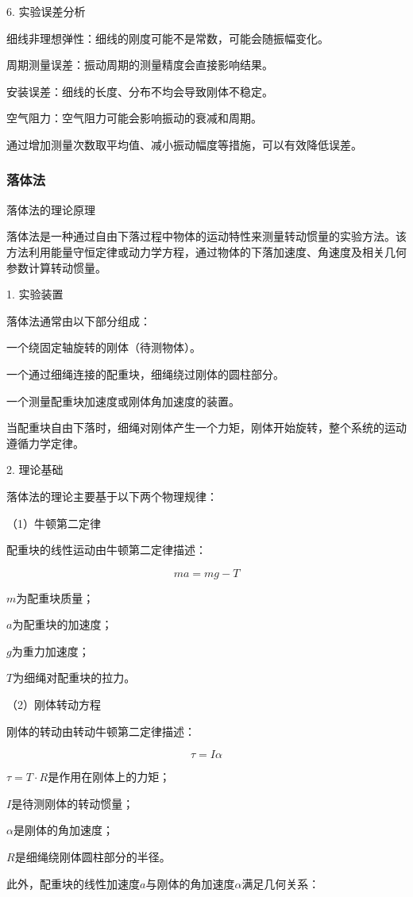 \documentclass[12pt,hyperref,a4paper,UTF8]{ctexart}
\begin{document}
6. 实验误差分析

细线非理想弹性：细线的刚度可能不是常数，可能会随振幅变化。

周期测量误差：振动周期的测量精度会直接影响结果。

安装误差：细线的长度、分布不均会导致刚体不稳定。

空气阻力：空气阻力可能会影响振动的衰减和周期。


通过增加测量次数取平均值、减小振动幅度等措施，可以有效降低误差。

\subsubsection{落体法}

落体法的理论原理

落体法是一种通过自由下落过程中物体的运动特性来测量转动惯量的实验方法。该方法利用能量守恒定律或动力学方程，通过物体的下落加速度、角速度及相关几何参数计算转动惯量。

1. 实验装置

落体法通常由以下部分组成：

一个绕固定轴旋转的刚体（待测物体）。

一个通过细绳连接的配重块，细绳绕过刚体的圆柱部分。

一个测量配重块加速度或刚体角加速度的装置。


当配重块自由下落时，细绳对刚体产生一个力矩，刚体开始旋转，整个系统的运动遵循力学定律。

2. 理论基础

落体法的理论主要基于以下两个物理规律：

（1）牛顿第二定律

配重块的线性运动由牛顿第二定律描述：

$$ ma = mg - T $$

 $m$为配重块质量；

 $a$为配重块的加速度；

 $g$为重力加速度；

 $T$为细绳对配重块的拉力。


（2）刚体转动方程

刚体的转动由转动牛顿第二定律描述：

$$  \tau = I \alpha $$

 $\tau=T\cdot R$是作用在刚体上的力矩；

 $I$是待测刚体的转动惯量；

 $\alpha$是刚体的角加速度；

 $R$是细绳绕刚体圆柱部分的半径。


此外，配重块的线性加速度$a$与刚体的角加速度$\alpha$满足几何关系：
\end{document}
